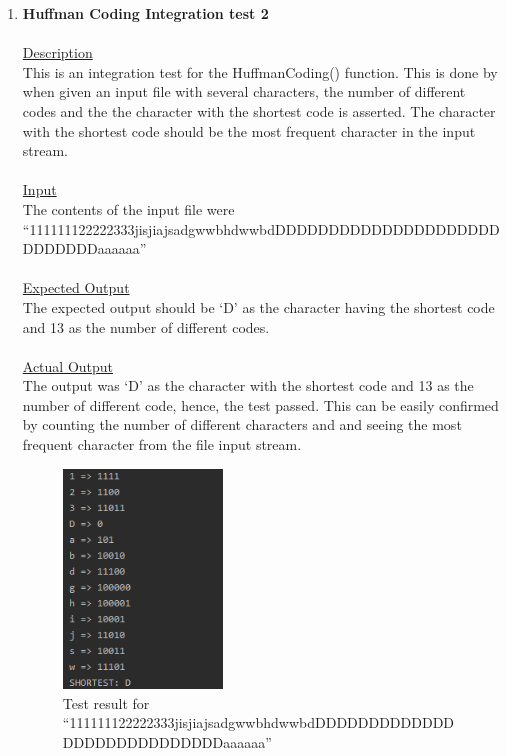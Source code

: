 \documentclass{article}
\newcommand{\quotes}[1]{``#1''}
\begin{document}
\begin{enumerate}
					\item \textbf{Huffman Coding Integration test 2}\\\\
		\underline{Description}\\
		\indent This is an integration test for the HuffmanCoding() function. This is done by when given an input file with several characters, the number of different codes and the the character with the shortest code is asserted. The character with the shortest code should be the most frequent character in the input stream.\\\\
		\underline{Input}\\
		\indent The contents of the input file were \\ \quotes{111111122222333jisjiajsadgwwbhdwwbdDDDDDDDDDDDDDDDDDDDDDDDDDDDDaaaaaa}\\	\\
		\underline{Expected Output}\\
		\indent The expected output should be `D' as the character having the shortest code and 13 as the number of different codes.\\\\
		\underline{Actual Output}\\
		The output was `D' as the character with the shortest code and 13 as the number of different code, hence, the test passed. This can be easily confirmed by counting the number of different characters and and seeing the most frequent character from the file input stream.
				\begin{figure}[H]
					\centering
			 			\includegraphics[width=0.4\textwidth]{hctest2.png}
			 			\centering
			  			\caption{Test result for \quotes{111111122222333jisjiajsadgwwbhdwwbdDDDDDDDDDDDDDDDDDDDDDDDDDDDDaaaaaa}}
			  			\label{fig:hctest2}
					\end{figure}
					

\end{enumerate}
\end{document}
